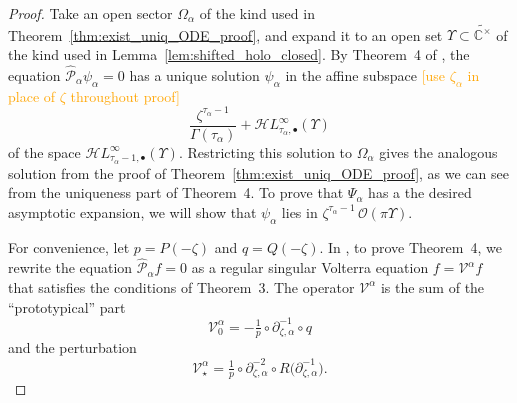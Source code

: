 \documentclass{article}
\newcommand{\singexp}[2]{\mathcal{H}L^\infty_{#1, #2}}
\newcommand{\singexpalg}[1]{\singexp{#1}{\bullet}}
\newcommand{\C}{\mathbb{C}}
\newcommand{\volterra}{\mathcal{V}}
\newcommand{\hardpart}{\mathcal{V}_0}
\newcommand{\softpart}{\mathcal{V}_\star}
\newcommand{\solwhole}{f}
\theoremstyle{definition}
\theoremstyle{plain}
\begin{document}
\begin{proof}
Take an open sector $\Omega_\alpha$ of the kind used in Theorem~\ref{thm:exist_uniq_ODE_proof}, and expand it to an open set $\Upsilon \subset \widetilde{\C^\times}$ of the kind used in Lemma~\ref{lem:shifted_holo_closed}. By Theorem~4 of \cite{reg-sing-volterra}, the equation $\hat{\mathcal{P}}_\alpha \psi_\alpha = 0$ has a unique solution $\psi_\alpha$ in the affine subspace \textcolor{orange}{[use $\zeta_\alpha$ in place of $\zeta$ throughout proof]}
\[ \frac{\zeta^{\tau_\alpha-1}}{\Gamma(\tau_\alpha)} + \singexpalg{\tau_\alpha}(\Upsilon) \]
of the space $\singexpalg{\tau_\alpha-1}(\Upsilon)$. Restricting this solution to $\Omega_\alpha$ gives the analogous solution from the proof of Theorem~\ref{thm:exist_uniq_ODE_proof}, as we can see from the uniqueness part of Theorem~4. To prove that $\Psi_\alpha$ has a the desired asymptotic expansion, we will show that $\psi_\alpha$ lies in $\zeta^{\tau_\alpha - 1}\,\mathcal{O}(\pi \Upsilon)$.

For convenience, let $p = P(-\zeta)$ and $q = Q(-\zeta)$. In \cite{reg-sing-volterra}, to prove Theorem~4, we rewrite the equation $\hat{\mathcal{P}}_\alpha \solwhole = 0$ as a regular singular Volterra equation $\solwhole = \volterra^\alpha \solwhole$ that satisfies the conditions of Theorem~3. The operator $\volterra^\alpha$ is the sum of the ``prototypical'' part
\[ \hardpart^\alpha = -\tfrac{1}{p} \circ \partial^{-1}_{\zeta, \alpha} \circ q \]
and the perturbation
\[ \softpart^\alpha = \tfrac{1}{p} \circ \partial^{-2}_{\zeta, \alpha} \circ R\big(\partial^{-1}_{\zeta, \alpha}\big). \]


\end{proof}
\end{document}
